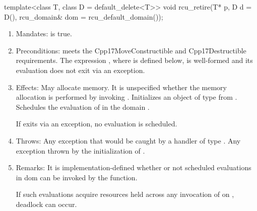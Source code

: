 \begin{codeblock}
template<class T, class D = default_delete<T>>
void rcu_retire(T* p, D d = D(), rcu_domain& dom = rcu_default_domain());
\end{codeblock}

\begin{enumerate}
\item	Mandates:  is true.
\item	Preconditions:  meets the Cpp17MoveConstructible and
	Cpp17Destructible requirements.
	The expression , where  is defined below,
	is well-formed and its evaluation does not exit via an exception.
\item	Effects: May allocate memory.
	It is unspecified whether the memory allocation is performed by
	invoking  .
	Initializes an object  of type  from
	.
	Schedules the evaluation of  in the domain
	.
	\begin{note}
	If  exits via an exception, no evaluation
	is scheduled.
	\end{note}
\item	Throws: Any exception that would be caught by a handler of type
	\tcode{bad_alloc}.
	Any exception thrown by the initialization of \tcode{d1}.
\item	Remarks: It is implementation-defined whether or not scheduled
	evaluations in dom can be invoked by the \tcode{rcu_retire}
	function.
	\begin{note}
	If such evaluations acquire resources held across any invocation
	of  on , deadlock can occur.
	\end{note}
\end{enumerate}
